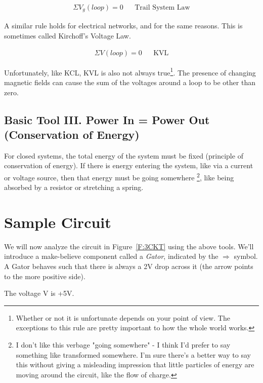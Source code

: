 \begin{align}
\Sigma V_g(loop)=0	&&\text{Trail System Law}
\end{align}

A similar rule holds for electrical networks, and for the same reasons. This is sometimes called Kirchoff's Voltage Law. 

\begin{align}
\Sigma V(loop)=0	&&\text{KVL}
\end{align}

Unfortunately, like KCL, KVL is also not always true\footnote{Whether or not it is unfortunate depends on your point of view. The exceptions to this rule are pretty important to how the whole world works.}. The presence of changing magnetic fields can cause the sum of the voltages around a loop to be other than zero.

\subsection{Basic Tool III. Power In = Power Out (Conservation of Energy)}
For closed systems, the total energy of the system must be fixed (principle of conservation of energy). If there is energy entering the system, like via a current or voltage source, then that energy must be going somewhere \footnote{I don't like this verbage "going somewhere" - I think I'd prefer to say something like transformed somewhere. I'm sure there's a better way to say this without giving a misleading impression that little particles of energy are moving around the circuit, like the flow of charge.}, like being absorbed by a resistor or stretching a spring.

\section{Sample Circuit}
We will now analyze the circuit in Figure~\ref{F:3CKT} using the above tools. We'll introduce a make-believe component called a \emph{Gator}, indicated by the $\Rightarrow$ symbol. A Gator behaves such that there is always a 2V drop across it (the arrow points to the more positive side).

\par
The voltage V is +5V.
\par

